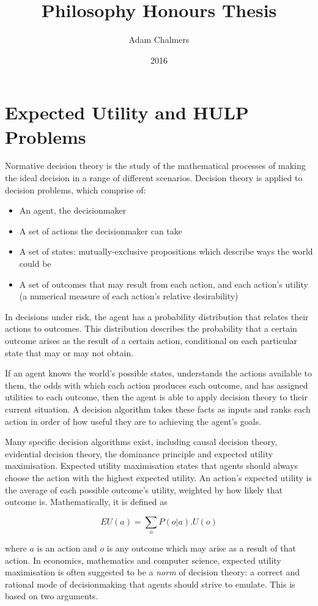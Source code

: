 \documentclass{article}
\title{Philosophy Honours Thesis}
\author{Adam Chalmers}
\date{2016}
\begin{document}
\maketitle

\section{Expected Utility and HULP Problems}
Normative decision theory is the study of the mathematical processes of making the ideal decision in a range of different scenarios. Decision theory is applied to decision problems, which comprise of:

\begin{itemize}  
\item An agent, the decisionmaker
\item A set of actions the decisionmaker can take
\item A set of states: mutually-exclusive propositions which describe ways the world could be
\item A set of outcomes that may result from each action, and each action's utility (a numerical measure of each action's relative desirability)
\end{itemize}

In decisions under risk, the agent has a probability distribution that relates their actions to outcomes. This distribution describes the probability that a certain outcome arises as the result of a certain action, conditional on each particular state that may or may not obtain.

If an agent knows the world's possible states, understands the actions available to them, the odds with which each action produces each outcome, and has assigned utilities to each outcome, then the agent is able to apply decision theory to their current situation. A decision algorithm takes these facts as inputs and ranks each action in order of how useful they are to achieving the agent's goals. 

Many specific decision algorithms exist, including causal decision theory, evidential decision theory, the dominance principle and expected utility maximisation. Expected utility maximisation states that agents should always choose the action with the highest expected utility. An action's expected utility is the average of each possible outcome's utility, weighted by how likely that outcome is. Mathematically, it is defined as

\[EU(a)=\sum_oP(o|a).U(o)\]

where \(a\) is an action and \(o\) is any outcome which may arise as a result of that action. In economics, mathematics and computer science, expected utility maximisation is often suggested to be a \textit{norm} of decision theory: a correct and rational mode of decisionmaking that agents should strive to emulate. This is based on two arguments.
\end{document}

